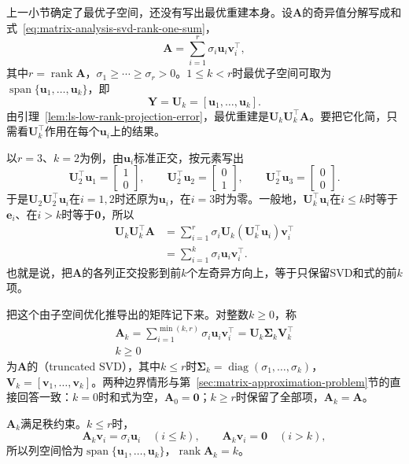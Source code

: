 上一小节确定了最优子空间，还没有写出最优重建本身。设$\bm A$的奇异值分解写成和式~\eqref{eq:matrix-analysis-svd-rank-one-sum}，
\[
 \bm A=\sum_{i=1}^r\sigma_i\bm u_i\bm v_i^\top ,
\]
其中$r=\operatorname{rank}\bm A$，$\sigma_1\geq\cdots\geq\sigma_r>0$。$1\leq k<r$时最优子空间可取为$\operatorname{span}\{\bm u_1,\ldots,\bm u_k\}$，即
\[
 \bm Y=\bm U_k=[\bm u_1,\ldots,\bm u_k].
\]
由引理~\ref{lem:ls-low-rank-projection-error}，最优重建是$\bm U_k\bm U_k^\top\bm A$。要把它化简，只需看$\bm U_k^\top$作用在每个$\bm u_i$上的结果。

以$r=3$、$k=2$为例，由$\bm u_i$标准正交，按元素写出
\[
 \bm U_2^\top\bm u_1=\begin{bmatrix}1\\0\end{bmatrix},\qquad
 \bm U_2^\top\bm u_2=\begin{bmatrix}0\\1\end{bmatrix},\qquad
 \bm U_2^\top\bm u_3=\begin{bmatrix}0\\0\end{bmatrix}.
\]
于是$\bm U_2\bm U_2^\top\bm u_i$在$i=1,2$时还原为$\bm u_i$，在$i=3$时为零。一般地，$\bm U_k^\top\bm u_i$在$i\leq k$时等于$\bm e_i$、在$i>k$时等于$\bm0$，所以
\[
 \begin{aligned}
 \bm U_k\bm U_k^\top\bm A
 &=\sum_{i=1}^r\sigma_i\bm U_k(\bm U_k^\top\bm u_i)\bm v_i^\top\\
 &=\sum_{i=1}^k\sigma_i\bm u_i\bm v_i^\top .
 \end{aligned}
\]
也就是说，把$\bm A$的各列正交投影到前$k$个左奇异方向上，等于只保留SVD和式的前$k$项。

把这个由子空间优化推导出的矩阵记下来。对整数$k\geq0$，称
\begin{equation}
\begin{gathered}
\bm A_k=\sum_{i=1}^{\min(k,r)}\sigma_i\bm u_i\bm v_i^\top
 =\bm U_k\bm\Sigma_k\bm V_k^\top\\
k\geq0
\end{gathered}
\label{eq:matrix-analysis-truncated-svd}
\end{equation}
为$\bm A$的（truncated SVD），其中$k\leq r$时$\bm\Sigma_k=\operatorname{diag}(\sigma_1,\ldots,\sigma_k)$，$\bm V_k=[\bm v_1,\ldots,\bm v_k]$。两种边界情形与第~\ref{sec:matrix-approximation-problem}节的直接回答一致：$k=0$时和式为空，$\bm A_0=\bm0$；$k\geq r$时保留了全部项，$\bm A_k=\bm A$。

$\bm A_k$满足秩约束。$k\leq r$时，
\[
 \bm A_k\bm v_i=\sigma_i\bm u_i\quad(i\leq k),\qquad
 \bm A_k\bm v_i=\bm0\quad(i>k),
\]
所以列空间恰为$\operatorname{span}\{\bm u_1,\ldots,\bm u_k\}$，$\operatorname{rank}\bm A_k=k$。

